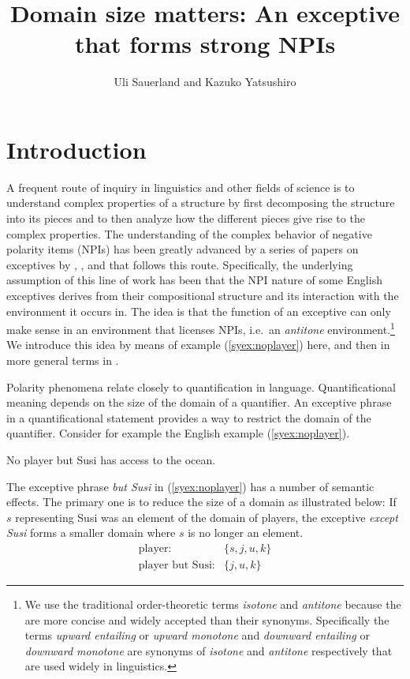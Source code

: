 \documentclass[output=paper]{langscibook}
\author{
    Uli Sauerland%
        \affiliation{Osaka University; Leibniz-Zentrum Allgemeine Sprachwissenschaft}
    and 
    Kazuko Yatsushiro%
        \affiliation{Leibniz-Zentrum Allgemeine Sprachwissenschaft}
}
\title{Domain size matters: An exceptive that forms strong NPIs}
\begin{document}

\maketitle


\section{Introduction}

A frequent route of inquiry in linguistics and other fields of science is to understand complex properties of a structure by first decomposing the structure into its pieces and to then analyze how the different pieces give rise to the complex properties.
The understanding of the complex behavior of negative polarity items (NPIs) has been greatly advanced by a series of papers on exceptives by \citet{fintel93}, \citet{gajewski08b}, and \citet{hirsch16b} that follows this  route.
Specifically, the underlying assumption of this line of work has been that the NPI nature of some English exceptives derives from their compositional structure and its interaction with the environment it occurs in.%
%
The idea is that the function of an exceptive can only make sense in an environment that licenses NPIs, i.e.\ an \emph{antitone} environment.\footnote{We use the traditional order-theoretic terms \emph{isotone} and \emph{antitone} \citep{birkhoff40a} because the are more concise and widely accepted than their synonyms.
Specifically the terms \emph{upward entailing} or \emph{upward monotone} and \emph{downward entailing} or \emph{downward monotone}  are synonyms of \emph{isotone} and \emph{antitone} respectively that are used widely in linguistics.}
We introduce this idea by means of example (\ref{syex:noplayer}) here, and then in more general terms in .

Polarity phenomena relate closely to quantification in language.
Quantificational meaning depends on the size of the domain of a quantifier.
An exceptive phrase in a quantificational statement provides a way to restrict the domain of the quantifier.  Consider for example the English example (\ref{syex:noplayer}).

\ea \label{syex:noplayer} 
   No player but Susi has access to the ocean.\z

The exceptive phrase \emph{but Susi} in (\ref{syex:noplayer}) has a number of semantic effects. The primary one is to reduce the size of a domain as illustrated below:
If $s$ representing Susi was an element of the domain of players, the exceptive \emph{except Susi} forms a smaller domain where $s$ is no longer an element.
\begin{eqnarray*}
\text{player:} & \{s, j, u, k\} \\
\text{player but Susi:} & \{j, u, k\}
\end{eqnarray*}
\end{document}
